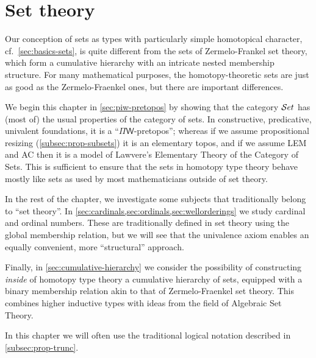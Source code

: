 \newcommand{\vset}{\mathsf{set}}  %
\newcommand{\cd}[1]{\left|#1\right|}
\newcommand{\inj}{\ensuremath{\mathsf{inj}}}
\newcommand{\acc}{\ensuremath{\mathsf{acc}}}


\chapter{Set theory}
\label{cha:set-math}

Our conception of sets as types with particularly simple homotopical character, cf.\
\autoref{sec:basics-sets}, is quite different from the sets of Zermelo-Frankel set theory, which form a
cumulative hierarchy with an intricate nested membership structure.
For many mathematical purposes, the homotopy-theoretic sets are just as good as
the Zermelo-Fraenkel ones, but there are important differences.

We begin this chapter in \autoref{sec:piw-pretopos} by showing that the category $\mathcal{S}et$ has (most of) the usual properties of the category of sets.
In constructive, predicative, univalent foundations, it is a ``$\Pi\mathsf{W}$-pretopos''; whereas if we assume propositional resizing (\autoref{subsec:prop-subsets}) it is an elementary topos, and if we assume LEM and AC then it is a model of Lawvere's Elementary Theory of the Category of Sets.
This is sufficient to ensure that the sets in homotopy type theory behave mostly like sets as used by most mathematicians outside of set theory.

In the rest of the chapter, we investigate some subjects that traditionally belong to ``set theory''.
In \autoref{sec:cardinals,sec:ordinals,sec:wellorderings} we study cardinal and ordinal numbers.
These are traditionally defined in set theory using the global membership relation, but we will see that the univalence axiom enables an equally convenient, more ``structural'' approach.

Finally, in \autoref{sec:cumulative-hierarchy} we consider the possibility of constructing \emph{inside} of homotopy type theory a cumulative hierarchy of sets, equipped with a binary membership relation akin to that of Zermelo-Fraenkel set theory.
This combines higher inductive types with ideas from the field of Algebraic Set Theory.

In this chapter we will often use the traditional logical notation described in \autoref{subsec:prop-trunc}.

